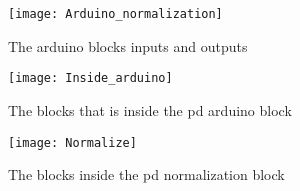 \begin{figure}
\texttt{[image: Arduino\_normalization]}
\caption{The arduino blocks inputs and outputs}
\label{Fig:Arudino_normalization}
\end{figure}

\begin{figure}
\texttt{[image: Inside\_arduino]}
\caption{The blocks that is inside the pd arduino block}
\label{Fig:Inside_arduino}
\end{figure}

\begin{figure}
\texttt{[image: Normalize]}
\caption{The blocks inside the pd normalization block}
\label{Fig:Normalize}
\end{figure}
